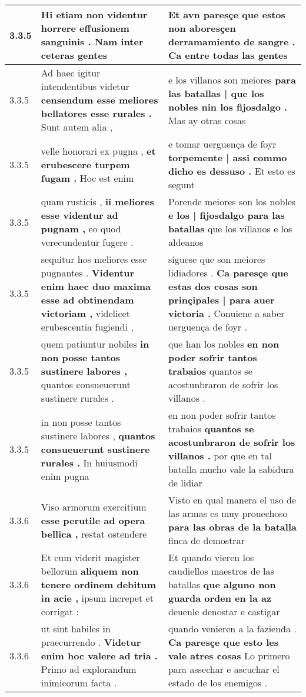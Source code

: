 \begin{tabular}{|p{1cm}|p{6.5cm}|p{6.5cm}|}
3.3.5 & Hi etiam non videntur \textbf{ horrere effusionem sanguinis . } Nam inter ceteras gentes & Et avn paresçe \textbf{ que estos non aboresçen derramamiento de sangre . } Ca entre todas las gentes \\\hline
3.3.5 & Ad haec igitur intendentibus videtur \textbf{ censendum esse meliores bellatores esse rurales . } Sunt autem alia , & e los villanos son meiores \textbf{ para las batallas | que los nobles nin los fijosdalgo . } Mas ay otras cosas \\\hline
3.3.5 & velle honorari ex pugna , \textbf{ et erubescere turpem fugam . } Hoc est enim & e tomar uerguença de foyr \textbf{ torpemente | assi commo dicho es dessuso . } Et esto es segunt \\\hline
3.3.5 & quam rusticis , \textbf{ ii meliores esse videntur ad pugnam , } eo quod verecundentur fugere . & Porende meiores son los nobles \textbf{ e los | fijosdalgo para las batallas } que los villanos e los aldeanos \\\hline
3.3.5 & sequitur hos meliores esse pugnantes . \textbf{ Videntur enim haec duo maxima esse ad obtinendam victoriam , } videlicet erubescentia fugiendi , & siguese que son meiores lidiadores . \textbf{ Ca paresçe que estas dos cosas son prinçipales | para auer victoria . } Conuiene a saber uerguença de foyr . \\\hline
3.3.5 & quem patiuntur nobiles \textbf{ in non posse tantos sustinere labores , } quantos consueuerunt sustinere rurales . & que han los nobles \textbf{ en non poder sofrir tantos trabaios } quantos se acostunbraron de sofrir los villanos . \\\hline
3.3.5 & in non posse tantos sustinere labores , \textbf{ quantos consueuerunt sustinere rurales . } In huiusmodi enim pugna & en non poder sofrir tantos trabaios \textbf{ quantos se acostunbraron de sofrir los villanos . } por que en tal batalla mucho vale la sabidura de lidiar \\\hline
3.3.6 & Viso armorum exercitium \textbf{ esse perutile ad opera bellica , } restat ostendere & Visto en qual manera el uso de las armas es muy prouechoso \textbf{ para las obras de la batalla } finca de demostrar \\\hline
3.3.6 & Et cum viderit magister bellorum \textbf{ aliquem non tenere ordinem debitum in acie , } ipsum increpet et corrigat : & Et quando vieren los caudiellos maestros de las batallas \textbf{ que alguno non guarda orden en la az } deuenle denostar e castigar \\\hline
3.3.6 & ut sint habiles in praecurrendo . \textbf{ Videtur enim hoc valere ad tria . } Primo ad explorandum inimicorum facta . & quando venieren a la fazienda . \textbf{ Ca paresçe que esto les vale atres cosas } Lo primero para assechar e ascuchar el estado de los enemigos . \\\hline

\end{tabular}
